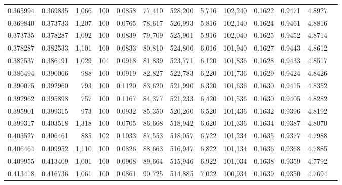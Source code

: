 \begin{tabular}{rrrrrrrrrrrrr}
0.365994 & 0.369835 & 1,066 & 100 &                                     0.0858 &  77,410 & 528,200 &   5,716 & 102,240 & 0.1622 & 0.9471 & 4.8927 \\
0.369840 & 0.373733 & 1,207 & 100 &                                     0.0765 &  78,617 & 526,993 &   5,816 & 102,140 & 0.1624 & 0.9461 & 4.8816 \\
0.373735 & 0.378287 & 1,092 & 100 &                                     0.0839 &  79,709 & 525,901 &   5,916 & 102,040 & 0.1625 & 0.9452 & 4.8714 \\
0.378287 & 0.382533 & 1,101 & 100 &                                     0.0833 &  80,810 & 524,800 &   6,016 & 101,940 & 0.1627 & 0.9443 & 4.8612 \\
0.382537 & 0.386491 & 1,029 & 104 &                                     0.0918 &  81,839 & 523,771 &   6,120 & 101,836 & 0.1628 & 0.9433 & 4.8517 \\
0.386494 & 0.390066 &   988 & 100 &                                     0.0919 &  82,827 & 522,783 &   6,220 & 101,736 & 0.1629 & 0.9424 & 4.8426 \\
0.390075 & 0.392960 &   793 & 100 &                                     0.1120 &  83,620 & 521,990 &   6,320 & 101,636 & 0.1630 & 0.9415 & 4.8352 \\
0.392962 & 0.395898 &   757 & 100 &                                     0.1167 &  84,377 & 521,233 &   6,420 & 101,536 & 0.1630 & 0.9405 & 4.8282 \\
0.395901 & 0.399315 &   973 & 100 &                                     0.0932 &  85,350 & 520,260 &   6,520 & 101,436 & 0.1632 & 0.9396 & 4.8192 \\
0.399317 & 0.403518 & 1,318 & 100 &                                     0.0705 &  86,668 & 518,942 &   6,620 & 101,336 & 0.1634 & 0.9387 & 4.8070 \\
0.403527 & 0.406461 &   885 & 102 &                                     0.1033 &  87,553 & 518,057 &   6,722 & 101,234 & 0.1635 & 0.9377 & 4.7988 \\
0.406464 & 0.409952 & 1,110 & 100 &                                     0.0826 &  88,663 & 516,947 &   6,822 & 101,134 & 0.1636 & 0.9368 & 4.7885 \\
0.409955 & 0.413409 & 1,001 & 100 &                                     0.0908 &  89,664 & 515,946 &   6,922 & 101,034 & 0.1638 & 0.9359 & 4.7792 \\
0.413418 & 0.416736 & 1,061 & 100 &                                     0.0861 &  90,725 & 514,885 &   7,022 & 100,934 & 0.1639 & 0.9350 & 4.7694 \\

\end{tabular}
